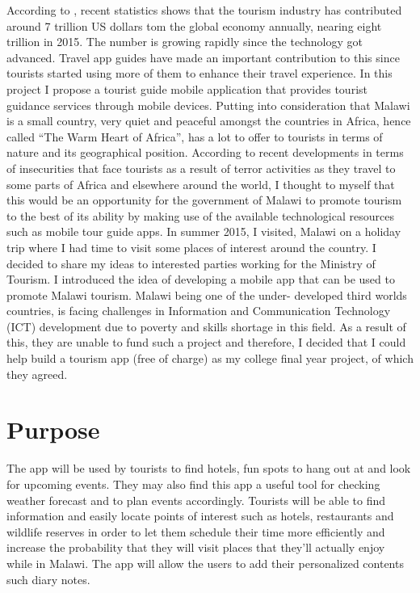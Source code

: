 According to \cite{Tourism}, recent statistics shows that the tourism industry has contributed around 7 trillion US dollars tom the global economy annually, nearing eight trillion in 2015. The number is growing rapidly since the technology got advanced. Travel app guides have made an important contribution to this since tourists started using more of them to enhance their travel experience.
In this project I propose a tourist guide mobile application that provides tourist guidance services through mobile devices. 
Putting into consideration that Malawi is a small country, very quiet and peaceful amongst the countries in Africa, hence called “The Warm Heart of Africa”, has a lot to offer to tourists in terms of nature and its geographical position. According to recent developments in terms of insecurities that face tourists as a result of terror activities as they travel to some parts of Africa and elsewhere around the world, I thought to myself that this would be an opportunity for the government of Malawi to promote tourism to the best of its ability by making use of the available technological resources such as mobile tour guide apps.
In summer 2015, I visited, Malawi on a holiday trip where I had time to visit some places of interest around the country. I decided to share my ideas to interested parties working for the Ministry of Tourism. I introduced the idea of developing a mobile app that can be used to promote Malawi tourism. 
Malawi being one of the under- developed third worlds countries, is facing challenges in Information and Communication Technology (ICT) development due to poverty and skills shortage in this field.
As a result of this, they are unable to fund such a project and therefore, I decided that I could help build a tourism app (free of charge) as my college final year project, of which they agreed. 

\section{Purpose}

The app will be used by tourists to find hotels, fun spots to hang out at and look for upcoming events.  They may also find this app a useful tool for checking weather forecast and to plan events accordingly. Tourists will be able to find information and easily locate points of interest such as hotels, restaurants and wildlife reserves in order to let them schedule their time more efficiently and increase the probability that they will visit places that they'll actually enjoy while in Malawi. The app will allow the users to add their personalized contents such diary notes.	

